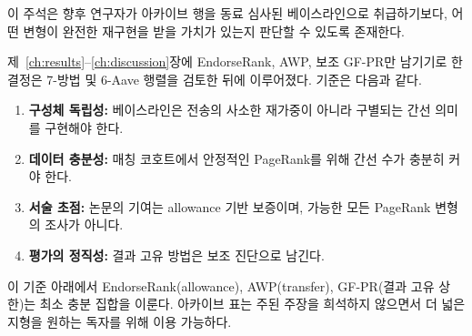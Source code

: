 이 주석은 향후 연구자가 아카이브 행을 동료 심사된 베이스라인으로 취급하기보다, 어떤 변형이 완전한 재구현을 받을 가치가 있는지 판단할 수 있도록 존재한다.


제~\ref{ch:results}--\ref{ch:discussion}장에 EndorseRank, AWP, 보조 GF-PR만 남기기로 한 결정은 7-방법 및 6-Aave 행렬을 검토한 뒤에 이루어졌다. 기준은 다음과 같다.

\begin{enumerate}
\item \textbf{구성체 독립성:} 베이스라인은 전송의 사소한 재가중이 아니라 구별되는 간선 의미를 구현해야 한다.
\item \textbf{데이터 충분성:} 매칭 코호트에서 안정적인 PageRank를 위해 간선 수가 충분히 커야 한다.
\item \textbf{서술 초점:} 논문의 기여는 allowance 기반 보증이며, 가능한 모든 PageRank 변형의 조사가 아니다.
\item \textbf{평가의 정직성:} 결과 고유 방법은 보조 진단으로 남긴다.
\end{enumerate}

이 기준 아래에서 EndorseRank(allowance), AWP(transfer), GF-PR(결과 고유 상한)는 최소 충분 집합을 이룬다. 아카이브 표는 주된 주장을 희석하지 않으면서 더 넓은 지형을 원하는 독자를 위해 이용 가능하다.
